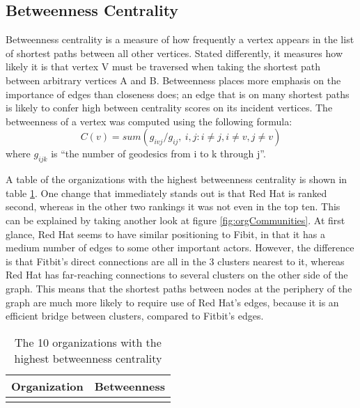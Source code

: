 \subsection{Betweenness Centrality}
 
Betweenness centrality is a measure of how frequently a vertex appears in the list of shortest paths between all other vertices. Stated differently, it measures how likely it is that vertex V must be traversed when taking the shortest path between arbitrary vertices A and B. Betweenness places more emphasis on the importance of edges than closeness does; an edge that is on many shortest paths is likely to confer high between centrality scores on its incident vertices. The betweenness of a vertex was computed using the following formula:
\begin{equation*}
C(v) = sum( g_{ivj} / g_{ij},\:i,j: i \neq j,i \neq v,j \neq v )
\end{equation*}
where $g_{ijk}$ is ``the number of geodesics from i to k through j''\cite{butts}. 

A table of the organizations with the highest betweenness centrality is shown in table \ref{tab:betweenness}. One change that immediately stands out is that Red Hat is ranked second, whereas in the other two rankings it was not even in the top ten. This can be explained by taking another look at figure \ref{fig:orgCommunities}. At first glance, Red Hat seems to have similar positioning to Fibit, in that it has a medium number of edges to some other important actors. However, the difference is that Fitbit's direct connections are all in the 3 clusters nearest to it, whereas Red Hat has far-reaching connections to several clusters on the other side of the graph. This means that the shortest paths between nodes at the periphery of the graph are much more likely to require use of Red Hat's edges, because it is an efficient bridge between clusters, compared to Fitbit's edges.

\begin{table}
	\begin{tabular}{l|c}%
		\bfseries Organization & \bfseries Betweenness%
		\csvreader[head to column names]{betweenness.csv}{}%
		{\\\hline\organizationc & \scorec}%
	\end{tabular}
	\centering
	\caption{The 10 organizations with the highest betweenness centrality}\label{tab:betweenness}
\end{table}

